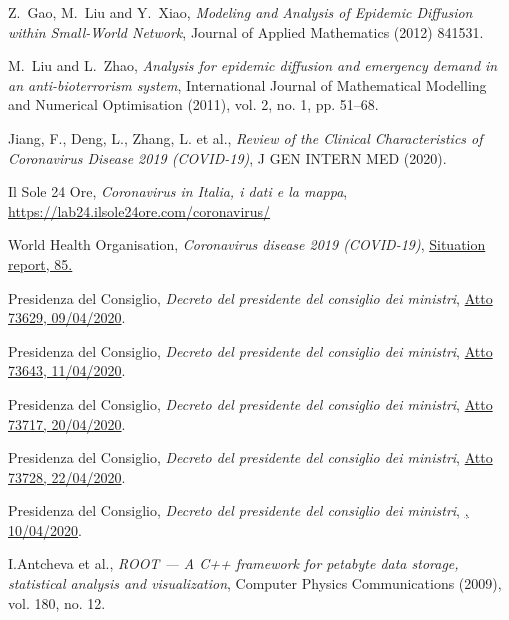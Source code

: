 \documentclass{article}
\begin{document}
\begin{thebibliography}{9}
Z.~Gao, M.~Liu and Y.~Xiao, 
\textit{Modeling and Analysis of Epidemic Diffusion within Small-World Network},
Journal of Applied Mathematics (2012) 841531.

M.~Liu and L.~Zhao, 
\textit{Analysis for epidemic diffusion and emergency demand in an anti-bioterrorism
system},
International Journal of Mathematical Modelling and Numerical Optimisation (2011), vol. 2, no. 1, pp. 51–68.

Jiang, F., Deng, L., Zhang, L. et al., \emph{ Review of the Clinical Characteristics of Coronavirus Disease 2019 (COVID-19)}, J GEN INTERN MED (2020).

Il Sole 24 Ore,
\textit{ 
Coronavirus in Italia, i dati e la mappa},
\href{https://lab24.ilsole24ore.com/coronavirus/}{https://lab24.ilsole24ore.com/coronavirus/}

World Health Organisation, \emph{Coronavirus disease 2019 (COVID-19)}, \href{https://www.who.int/docs/default-source/coronaviruse/situation-reports/20200414-sitrep-85-covid-19.pdf?sfvrsn=7b8629bb_4}{Situation report, 85.}

Presidenza del Consiglio, \emph{Decreto del presidente del consiglio dei ministri}, \href{http://www.trovanorme.salute.gov.it/norme/dettaglioAtto?id=73629}{Atto 73629, 09/04/2020}.

Presidenza del Consiglio, \emph{Decreto del presidente del consiglio dei ministri}, \href{http://www.trovanorme.salute.gov.it/norme/dettaglioAtto?id=73643}{Atto 73643, 11/04/2020}.

Presidenza del Consiglio, \emph{Decreto del presidente del consiglio dei ministri}, \href{http://www.trovanorme.salute.gov.it/norme/dettaglioAtto?id=73717}{Atto 73717, 20/04/2020}.

Presidenza del Consiglio, \emph{Decreto del presidente del consiglio dei ministri}, \href{http://www.trovanorme.salute.gov.it/norme/dettaglioAtto?id=73728}{Atto 73728, 22/04/2020}.

Presidenza del Consiglio, \emph{Decreto del presidente del consiglio dei ministri}, \href{https://www.gazzettaufficiale.it/atto/serie_generale/caricaDettaglioAtto/originario?atto.dataPubblicazioneGazzetta=2020-04-11&atto.codiceRedazionale=20A02179&elenco30giorni=true
}{, 10/04/2020}.

I.Antcheva et al., 
\textit{ 
ROOT — A C++ framework for petabyte data storage, statistical analysis and visualization},
Computer Physics Communications (2009), vol. 180, no. 12.


\end{thebibliography}
\end{document}
